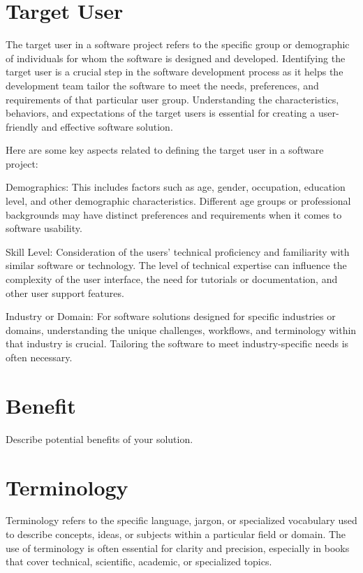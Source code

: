 \section{Target User}
\label{section:target-user}

The target user in a software project refers to the specific
group or demographic of individuals for whom the software is designed and
developed. Identifying the target user is a crucial step in the software
development process as it helps the development team tailor the software to
meet the needs, preferences, and requirements of that particular user group.
Understanding the characteristics, behaviors, and expectations of the target
users is essential for creating a user-friendly and effective software solution.

Here are some key aspects related to defining the target user in a software project:

Demographics: This includes factors such as age, gender,
occupation, education level, and other demographic characteristics. Different
age groups or professional backgrounds may have distinct preferences and
requirements when it comes to software usability.

Skill Level: Consideration of the users' technical proficiency and
familiarity with similar software or technology. The level of technical expertise
can influence the complexity of the user interface, the need for tutorials or
documentation, and other user support features.

Industry or Domain: For software solutions designed for specific
industries or domains, understanding the unique challenges, workflows, and
terminology within that industry is crucial. Tailoring the software to meet
industry-specific needs is often necessary.

\section{Benefit}
\label{section:benefit}

Describe potential benefits of your solution.

\section{Terminology}
\label{section:terminology}

Terminology refers to the specific language, jargon, or
specialized vocabulary used to describe concepts, ideas, or subjects within a
particular field or domain. The use of terminology is often essential for clarity
and precision, especially in books that cover technical, scientific, academic, or
specialized topics.